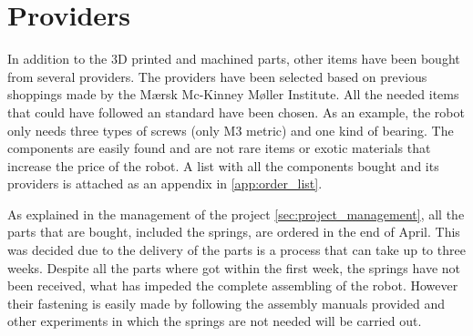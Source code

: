\section{Providers} %
\label{sec:providers}
In addition to the 3D printed and machined parts, other items have been bought from several providers.
The providers have been selected based on previous shoppings made by the Mærsk Mc-Kinney Møller Institute.
All the needed items that could have followed an standard have been chosen. 
As an example, the robot only needs three types of screws (only M3 metric) and one kind of bearing.
The components are easily found and are not rare items or exotic materials that increase the price of the robot.
A list with all the components bought and its providers is attached as an appendix in \ref{app:order_list}.

As explained in the management of the project \ref{sec:project_management}, all the parts that are bought, included the springs, are ordered in the end of April. 
This was decided due to the delivery of the parts is a process that can take up to three weeks.
Despite all the parts where got within the first week, the springs have not been received, what has impeded the complete assembling of the robot.
However their fastening is easily made by following the assembly manuals provided and other experiments in which the springs are not needed will be carried out.

